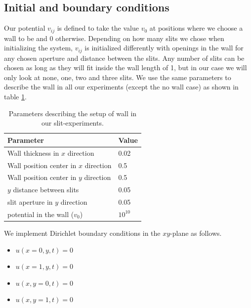 \documentclass[english,notitlepage,reprint,nofootinbib]{revtex4-1}  %
\begin{document}
\subsection*{Initial and boundary conditions}
Our potential $v_{ij}$ is defined to take the value $v_0$ at positions where we choose a wall to be and 0 otherwise. Depending on how many slits we chose when initializing the system, $v_{ij}$ is initialized differently with openings in the wall for any chosen aperture and distance between the slits. Any number of slits can be chosen as long as they will fit inside the wall length of 1, but in our case we will only look at none, one, two and three slits. We use the same parameters to describe the wall in all our experiments (except the no wall case) as shown in table \ref{tab:wall}.
\begin{table}[H]
    \begin{small}
        \caption{Parameters describing the setup of wall in our slit-experiments.}
        \label{tab:wall}
        \begin{center}
            \begin{tabular}{|l|l|}
                \hline
                \textbf{Parameter}                    & \textbf{Value} \\
                \hline
                Wall thickness in $x$ direction       & 0.02           \\
                \hline
                Wall position center in $x$ direction & 0.5            \\
                \hline
                Wall position center in $y$ direction & 0.5            \\
                \hline
                $y$ distance between slits            & 0.05           \\
                \hline
                slit aperture in $y$ direction        & 0.05           \\
                \hline
                potential in the wall ($v_0$)         & $10^{10}$      \\
                \hline
            \end{tabular}
        \end{center}
    \end{small}
\end{table}
We implement Dirichlet boundary conditions in the $xy$-plane as follows.
\begin{itemize}
    \item $u(x=0,y,t) = 0$
    \item $u(x=1,y,t) = 0$
    \item $u(x,y=0,t) = 0$
    \item $u(x,y=1,t) = 0$
\end{itemize}
\end{document}
